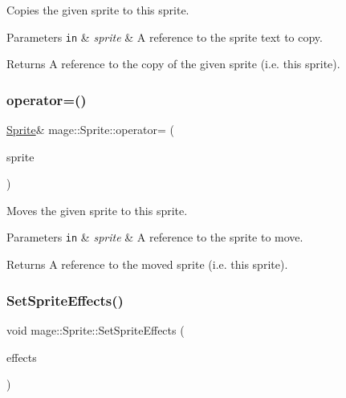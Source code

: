 Copies the given sprite to this sprite.


\begin{DoxyParams}[1]{Parameters}
\mbox{\tt in}  & {\em sprite} & A reference to the sprite text to copy. \\
\hline
\end{DoxyParams}
\begin{DoxyReturn}{Returns}
A reference to the copy of the given sprite (i.\+e. this sprite). 
\end{DoxyReturn}
\hypertarget{classmage_1_1_sprite_a808d87aeb6d652f9a53e967a75a1eede}{}\label{classmage_1_1_sprite_a808d87aeb6d652f9a53e967a75a1eede} 
\subsubsection{\texorpdfstring{operator=()}{operator=()}\hspace{0.1cm}{\footnotesize\ttfamily [2/2]}}
{\footnotesize\ttfamily \hyperlink{classmage_1_1_sprite}{Sprite}\& mage\+::\+Sprite\+::operator= (\begin{DoxyParamCaption}\item[{\hyperlink{classmage_1_1_sprite}{Sprite} \&\&}]{sprite }\end{DoxyParamCaption})\hspace{0.3cm}{\ttfamily [delete]}}

Moves the given sprite to this sprite.


\begin{DoxyParams}[1]{Parameters}
\mbox{\tt in}  & {\em sprite} & A reference to the sprite to move. \\
\hline
\end{DoxyParams}
\begin{DoxyReturn}{Returns}
A reference to the moved sprite (i.\+e. this sprite). 
\end{DoxyReturn}
\hypertarget{classmage_1_1_sprite_abeefc8ed41e55924be83ba7b480aa40e}{}\label{classmage_1_1_sprite_abeefc8ed41e55924be83ba7b480aa40e} 
\subsubsection{\texorpdfstring{Set\+Sprite\+Effects()}{SetSpriteEffects()}}
{\footnotesize\ttfamily void mage\+::\+Sprite\+::\+Set\+Sprite\+Effects (\begin{DoxyParamCaption}\item[{\hyperlink{namespacemage_a9cfe18123066ba4236f548f9de75d881}{Sprite\+Effect}}]{effects }\end{DoxyParamCaption})\hspace{0.3cm}{\ttfamily [noexcept]}}

